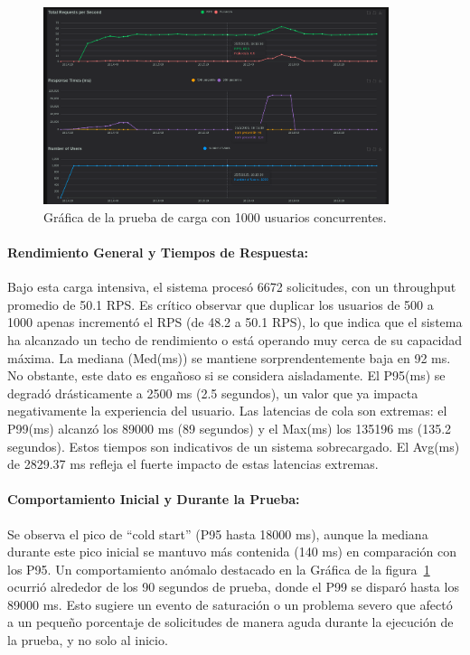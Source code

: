 \begin{figure}[H]
\centering
\includegraphics[width=0.9\textwidth]{figures/08_1000_1.png}
\caption{Gráfica de la prueba de carga con 1000 usuarios concurrentes.}
\label{fig:locust1000}
\end{figure}

\paragraph{Rendimiento General y Tiempos de Respuesta:}
Bajo esta carga intensiva, el sistema procesó 6672 solicitudes, con un throughput promedio de 50.1 RPS. Es crítico observar que duplicar los usuarios de 500 a 1000 apenas incrementó el RPS (de 48.2 a 50.1 RPS), lo que indica que el sistema ha alcanzado un techo de rendimiento o está operando muy cerca de su capacidad máxima.
La mediana (Med(ms)) se mantiene sorprendentemente baja en 92 ms. No obstante, este dato es engañoso si se considera aisladamente. El P95(ms) se degradó drásticamente a 2500 ms (2.5 segundos), un valor que ya impacta negativamente la experiencia del usuario. Las latencias de cola son extremas: el P99(ms) alcanzó los 89000 ms (89 segundos) y el Max(ms) los 135196 ms (135.2 segundos). Estos tiempos son indicativos de un sistema sobrecargado. El Avg(ms) de 2829.37 ms refleja el fuerte impacto de estas latencias extremas.

\paragraph{Comportamiento Inicial y Durante la Prueba:}
Se observa el pico de ``cold start'' (P95 hasta 18000 ms), aunque la mediana durante este pico inicial se mantuvo más contenida (140 ms) en comparación con los P95. Un comportamiento anómalo destacado en la Gráfica de la figura~\ref{fig:locust1000} ocurrió alrededor de los 90 segundos de prueba, donde el P99 se disparó hasta los 89000 ms. Esto sugiere un evento de saturación o un problema severo que afectó a un pequeño porcentaje de solicitudes de manera aguda durante la ejecución de la prueba, y no solo al inicio.

